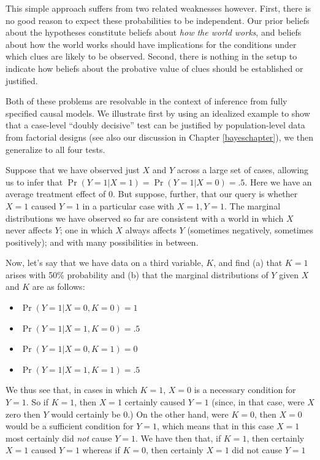 \documentclass[
  12pt,
]{book}
\providecommand{\tightlist}{%
  \setlength{\itemsep}{0pt}\setlength{\parskip}{0pt}}
\begin{document}
This simple approach suffers from two related weaknesses however. First, there is no good reason to expect these probabilities to be independent. Our prior beliefs about the hypotheses constitute beliefs about \emph{how the world works}, and beliefs about how the world works should have implications for the conditions under which clues are likely to be observed. Second, there is nothing in the setup to indicate how beliefs about the probative value of clues should be established or justified.

Both of these problems are resolvable in the context of inference from fully specified causal models. We illustrate first by using an idealized example to show that a case-level ``doubly decisive'' test can be justified by population-level data from factorial designs (see also our discussion in Chapter \ref{bayeschapter}), we then generalize to all four tests.

Suppose that we have observed just \(X\) and \(Y\) across a large set of cases, allowing us to infer that \(\Pr(Y=1|X=1) = \Pr(Y=1|X=0) = .5\). Here we have an average treatment effect of 0. But suppose, further, that our query is whether \(X=1\) caused \(Y=1\) in a particular case with \(X=1, Y=1\). The marginal distributions we have observed so far are consistent with a world in which \(X\) never affects \(Y\); one in which \(X\) always affects \(Y\) (sometimes negatively, sometimes positively); and with many possibilities in between.

Now, let's say that we have data on a third variable, \(K\), and find (a) that \(K=1\) arises with 50\% probability and (b) that the marginal distributions of \(Y\) given \(X\) and \(K\) are as follows:

\begin{itemize}
\tightlist
\item
  \(\Pr(Y=1|X=0, K = 0) = 1\)
\item
  \(\Pr(Y=1|X=1, K = 0) = .5\)
\item
  \(\Pr(Y=1|X=0, K = 1) = 0\)
\item
  \(\Pr(Y=1|X=1, K = 1) = .5\)
\end{itemize}

We thus see that, in cases in which \(K=1\), \(X=0\) is a necessary condition for \(Y=1\). So if \(K=1\), then \(X=1\) certainly caused \(Y=1\) (since, in that case, were \(X\) zero then \(Y\) would certainly be 0.) On the other hand, were \(K=0\), then \(X=0\) would be a sufficient condition for \(Y=1\), which means that in this case \(X=1\) most certainly did \emph{not} cause \(Y=1\). We have then that, if \(K=1\), then certainly \(X=1\) caused \(Y=1\) whereas if \(K=0\), then certainly \(X=1\) did not cause \(Y=1\)
\end{document}
